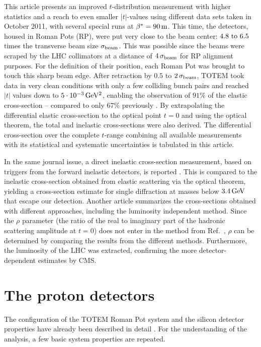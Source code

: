 \documentclass[doublecol]{epl/epl2}
\def\un#1{\,{\rm #1}}
\begin{document}
This article presents an improved $t$-distribution measurement with higher statistics and a reach to even smaller $|t|$-values using different data sets taken in October 2011, with several special runs at $\beta^* = 90\un{m}$. This time, the detectors, housed in Roman Pots (RP), were put very close to the beam center: $4.8 \hbox{ to } 6.5$ times the transverse beam size $\sigma_{\rm beam}$. This was possible since the beams were scraped by the LHC collimators at a distance of $4\,\sigma_{\rm beam}$ for RP alignment purposes. For the definition of their position, each Roman Pot was brought to touch this sharp beam edge. After retraction by $0.5$ to $2\,\sigma_{\rm beam}$, TOTEM took data in very clean conditions with only a few colliding bunch pairs and reached $|t|$ values down to $5\cdot10^{-3}\un{GeV^2}$, enabling the observation of $91\%$ of the elastic cross-section -- compared to only $67\%$ previously \cite{epl96}. By extrapolating the differential elastic cross-section to the optical point $t=0$ and using the optical theorem, the total and inelastic cross-sections were also derived. The differential cross-section over the complete $t$-range combining all available measurements with its statistical and systematic uncertainties is tabulated in this article.

In the same journal issue, a direct inelastic cross-section measurement, based on triggers from the forward inelastic detectors, is reported \cite{P2}. This is compared to the inelastic cross-section obtained from elastic scattering via the optical theorem, yielding a cross-section estimate for single diffraction at masses below $3.4\un{GeV}$ that escape our detection. Another article \cite{P3} summarizes the cross-sections obtained with different approaches, including the luminosity independent method. Since the $\rho$ parameter (the ratio of the real to imaginary part of the hadronic scattering amplitude at $t=0$) does not enter in the method from Ref.~\cite{P2}, $\rho$ can be determined by comparing the results from the different methods. Furthermore, the luminosity of the LHC was extracted, confirming the more detector-dependent estimates by CMS. 



\section{The proton detectors}

The configuration of the TOTEM Roman Pot system and the silicon detector properties have already been described in detail \cite{jinst,epl95,epl96}. For the understanding of the analysis, a few basic  system  properties are repeated. 
\end{document}
